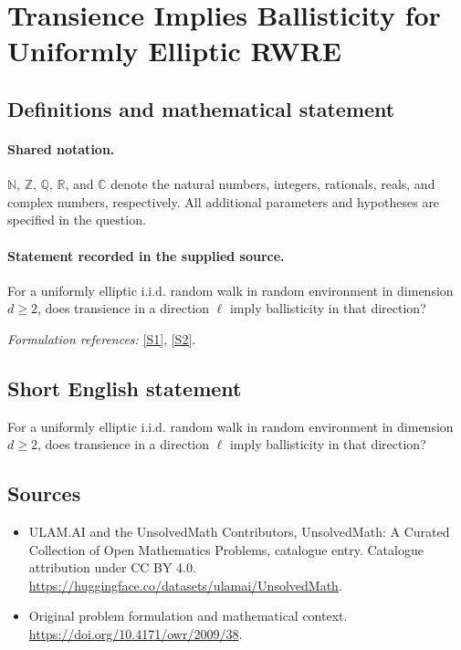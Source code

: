 \documentclass[11pt]{article}
\newcommand{\sref}[2]{\hyperlink{source:#1:#2}{[S#2]}}
\begin{document}
\section{Transience Implies Ballisticity for Uniformly Elliptic RWRE}\label{statement}

\subsection{Definitions and mathematical statement}

\paragraph{Shared notation.}$\mathbb N$, $\mathbb Z$, $\mathbb Q$, $\mathbb R$, and $\mathbb C$ denote the natural numbers, integers, rationals, reals, and complex numbers, respectively. All additional parameters and hypotheses are specified in the question.


\paragraph{Statement recorded in the supplied source.}
For a uniformly elliptic i.i.d. random walk in random environment in dimension $d\geq2$, does transience in a direction $\ell$ imply ballisticity in that direction?
\par\smallskip\textit{Formulation references:} \sref{statement}{1}, \sref{statement}{2}.
\subsection{Short English statement}
For a uniformly elliptic i.i.d. random walk in random environment in dimension $d\geq2$, does transience in a direction $\ell$ imply ballisticity in that direction?
\subsection{Sources}
\begin{itemize}
\item[\hypertarget{source:statement:1}{S1}] ULAM.AI and the UnsolvedMath Contributors, UnsolvedMath: A Curated Collection of Open Mathematics Problems, catalogue entry. Catalogue attribution under CC BY 4.0.
\url{https://huggingface.co/datasets/ulamai/UnsolvedMath}.
\item[\hypertarget{source:statement:2}{S2}] Original problem formulation and mathematical context.
\url{https://doi.org/10.4171/owr/2009/38}.
\end{itemize}
\label{end:statement}
\end{document}
